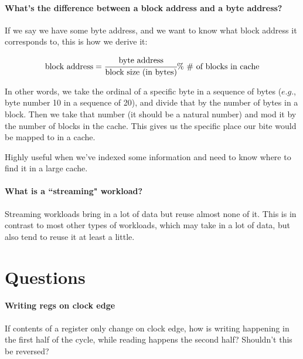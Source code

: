 \documentclass[a4paper]{article}
\begin{document}
\paragraph{What's the difference between a block address and a byte address?} If we say we have some byte address, and we want to know what block address it corresponds to, this is how we derive it:

\begin{equation*}
\mbox{block address} = \cfrac{\mbox{byte address}}{\mbox{block size (in bytes)}} \% \mbox{ \# of blocks in cache}
\end{equation*} 

In other words, we take the ordinal of a specific byte in a sequence of bytes ($\textit{e.g.}$, byte number 10 in a sequence of 20), and divide that by the number of bytes in a block. Then we take that number (it should be a natural number) and mod it by the number of blocks in the cache. This gives us the specific place our bite would be mapped to in a cache.

Highly useful when we've indexed some information and need to know where to find it in a large cache.

\paragraph{What is a ``streaming" workload?} Streaming workloads bring in a lot of data but reuse almost none of it. This is in contrast to most other types of workloads, which may take in a lot of data, but also tend to reuse it at least a little.

\section*{Questions}

\paragraph{Writing regs on clock edge} If contents of a register only change on clock edge, how is writing happening in the first half of the cycle, while reading happens the second half? Shouldn't this be reversed?
\end{document}
